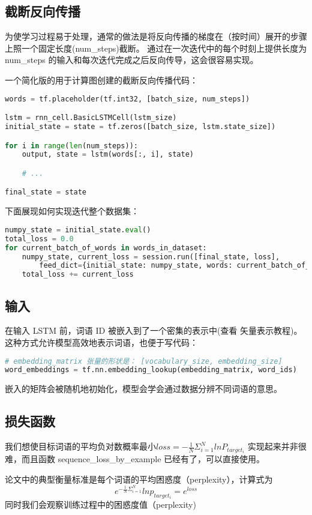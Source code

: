 \subsection{截断反向传播}
为使学习过程易于处理，通常的做法是将反向传播的梯度在（按时间）展开的步骤上照一个固定长度(num\_steps)截断。 通过在一次迭代中的每个时刻上提供长度为 num\_steps 的输入和每次迭代完成之后反向传导，这会很容易实现。

一个简化版的用于计算图创建的截断反向传播代码：
\begin{lstlisting}[language=Python]
words = tf.placeholder(tf.int32, [batch_size, num_steps])

lstm = rnn_cell.BasicLSTMCell(lstm_size)
initial_state = state = tf.zeros([batch_size, lstm.state_size])

for i in range(len(num_steps)):
    output, state = lstm(words[:, i], state)

    # ...

final_state = state
\end{lstlisting}
下面展现如何实现迭代整个数据集：
\begin{lstlisting}[language=Python]
numpy_state = initial_state.eval()
total_loss = 0.0
for current_batch_of_words in words_in_dataset:
    numpy_state, current_loss = session.run([final_state, loss],
        feed_dict={initial_state: numpy_state, words: current_batch_of_words})
    total_loss += current_loss
\end{lstlisting}
\subsection{输入}
在输入 LSTM 前，词语 ID 被嵌入到了一个密集的表示中(查看 矢量表示教程)。这种方式允许模型高效地表示词语，也便于写代码：
\begin{lstlisting}[language=Python]
# embedding_matrix 张量的形状是： [vocabulary_size, embedding_size]
word_embeddings = tf.nn.embedding_lookup(embedding_matrix, word_ids)
\end{lstlisting}
嵌入的矩阵会被随机地初始化，模型会学会通过数据分辨不同词语的意思。
\subsection{损失函数}
我们想使目标词语的平均负对数概率最小$loss = -\frac{1}{N}\Sigma_{i=1}^NlnP_{target_i}$
实现起来并非很难，而且函数 sequence\_loss\_by\_example 已经有了，可以直接使用。

论文中的典型衡量标准是每个词语的平均困惑度（perplexity），计算式为
$$e^{-\frac{1}{N}\Sigma_{i=1}^N}lnp_{target_i}=e^{loss}$$
同时我们会观察训练过程中的困惑度值（perplexity)

